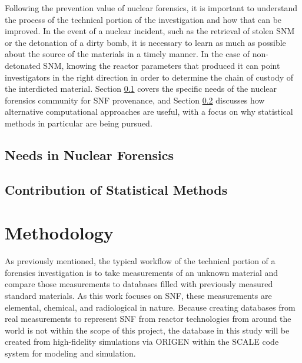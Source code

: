 Following the prevention value of nuclear forensics, it is important to
understand the process of the technical portion of the investigation and how
that can be improved.  In the event of a nuclear incident, such as the
retrieval of stolen \gls{SNM} or the detonation of a dirty bomb, it is
necessary to learn as much as possible about the source of the materials in a
timely manner. In the case of non-detonated \gls{SNM}, knowing the reactor
parameters that produced it can point investigators in the right direction in
order to determine the chain of custody of the interdicted material.  Section
\ref{sec:nfneeds} covers the specific needs of the nuclear forensics community
for \gls{SNF} provenance, and Section \ref{sec:statscontrib} discusses how
alternative computational approaches are useful, with a focus on why
statistical methods in particular are being pursued. 

\subsection{Needs in Nuclear Forensics}

\label{sec:nfneeds}

\subsection{Contribution of Statistical Methods}

\label{sec:statscontrib}

\section{Methodology}
\label{sec:methodology}

As previously mentioned, the typical workflow of the technical portion of a
forensics investigation is to take measurements of an unknown material and
compare those measurements to databases filled with previously measured
standard materials. As this work focuses on \gls{SNF}, these measurements are
elemental, chemical, and radiological in nature.  Because creating databases
from real measurements to represent \gls{SNF} from reactor technologies from
around the world is not within the scope of this project, the database in this
study will be created from high-fidelity simulations via \gls{ORIGEN}
\cite{origen} within the SCALE code system \cite{scale} for modeling and
simulation. 


